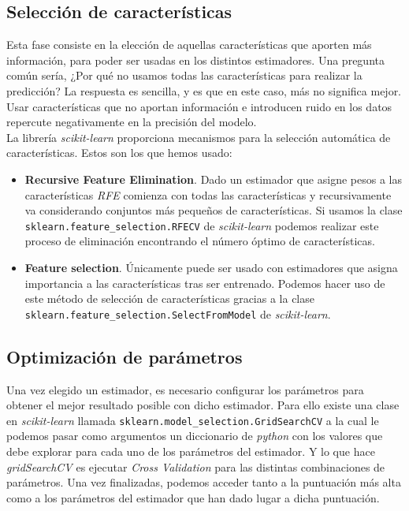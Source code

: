 \subsection{Selección de características}
Esta fase consiste en la elección de aquellas características que aporten más información, para poder ser usadas en los distintos estimadores.
Una pregunta común sería, ¿Por qué no usamos todas las características para realizar la predicción? La respuesta es sencilla, y es que en este caso, más no significa mejor.
Usar características que no aportan información e introducen ruido en los datos repercute negativamente en la precisión del modelo.\\


La librería \textit{scikit-learn} proporciona mecanismos para la selección automática de características.
Estos son los que hemos usado:

\begin{itemize}
\item \textbf{Recursive Feature Elimination}. Dado un estimador que asigne pesos a las características \textit{RFE} comienza con todas las características y recursivamente va considerando conjuntos más pequeños de características.
Si usamos la clase \texttt{sklearn.feature\_selection.RFECV} de \textit{scikit-learn} podemos realizar este proceso de eliminación encontrando el número óptimo de características.

\item \textbf{Feature selection}. Únicamente puede ser usado con estimadores que asigna importancia a las características tras ser entrenado. Podemos hacer uso de este método de selección de características gracias a la clase \texttt{sklearn.feature\_selection.SelectFromModel} de \textit{scikit-learn}.

\end{itemize}

\subsection{Optimización de parámetros}
Una vez elegido un estimador, es necesario configurar los parámetros para obtener el mejor resultado posible con dicho estimador. Para ello existe una clase en \textit{scikit-learn} llamada \texttt{sklearn.model\_selection.GridSearchCV} a la cual le podemos pasar como argumentos un diccionario de \textit{python} con los valores que debe explorar para cada uno de los parámetros del estimador. Y lo que hace \textit{gridSearchCV} es ejecutar \textit{Cross Validation} para las distintas combinaciones de parámetros.
Una vez finalizadas, podemos acceder tanto a la puntuación más alta como a los parámetros del estimador que han dado lugar a dicha puntuación.


